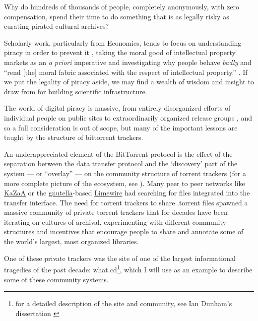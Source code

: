 \documentclass[10pt]{article}
\begin{document}
\begin{multicols}{2}
Why do hundreds of thousands of people, completely anonymously, with
zero compensation, spend their time to do something that is as legally
risky as curating pirated cultural archives?

Scholarly work, particularly from Economics, tends to focus on
understanding piracy in order to prevent it\cite{basamanowiczReleaseGroupsDigital2011, hindujaDeindividuationInternetSoftware2008} , taking the moral good
of intellectual property markets as an \emph{a priori} imperative and
investigating why people behave \emph{badly} and ``rend {[}the{]} moral
fabric associated with the respect of intellectual property.'' \cite{hindujaDeindividuationInternetSoftware2008} . If we put the legality
of piracy aside, we may find a wealth of wisdom and insight to draw from
for building scientific infrastructure.

The world of digital piracy is massive, from entirely disorganized
efforts of individual people on public sites to extraordinarily
organized release groups \cite{basamanowiczReleaseGroupsDigital2011} , and so a full consideration is out of scope, but many of the
important lessons are taught by the structure of bittorrent trackers.

An underappreciated element of the BitTorrent protocol is the effect of
the separation between the data transfer protocol and the `discovery'
part of the system --- or ``overlay'' --- on the community structure of
torrent trackers (for a more complete picture of the ecosystem, see \cite{zhangUnravelingBitTorrentEcosystem2011} ). Many peer to peer
networks like \href{https://en.wikipedia.org/wiki/Kazaa}{KaZaA} or the
\href{https://en.wikipedia.org/wiki/Gnutella}{gnutella}-based
\href{https://en.wikipedia.org/wiki/LimeWire}{Limewire} had searching
for files integrated into the transfer interface. The need for torrent
trackers to share .torrent files spawned a massive community of private
torrent trackers that for decades have been iterating on cultures of
archival, experimenting with different community structures and
incentives that encourage people to share and annotate some of the
world's largest, most organized libraries.

One of these private trackers was the site of one of the largest
informational tragedies of the past decade: what.cd\footnote{for a
  detailed description of the site and community, see Ian Dunham's
  dissertation \cite{dunhamWhatCDLegacy2018} }, which I will use
as an example to describe some of these community systems.


\end{multicols}
\end{document}
